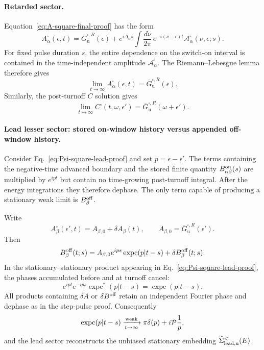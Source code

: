 \documentclass[
 reprint,
 superscriptaddress,
 amsmath,amssymb,
 aps,prb,
 longbibliography,
 floatfix
]{revtex4-2}
\newcommand{\expc}{\operatorname{expc}}
\begin{document}
\paragraph{Retarded sector.}
Equation~\eqref{eq:A-square-final-proof} has the form
\begin{equation*}
A_\alpha^\square(\epsilon,t)
=
\overline G_{\mathrm u}^{\square,R}(\epsilon)
+
e^{i\Delta_\alpha s}
\int\frac{d\nu}{2\pi}\,
e^{-i(\nu-\epsilon)t}
\mathcal A_\alpha^\square(\nu,\epsilon;s).
\end{equation*}
For fixed pulse duration \(s\), the entire dependence on the switch-on interval is contained in the time-independent amplitude \(\mathcal A_\alpha^\square\). The Riemann--Lebesgue lemma therefore gives
\begin{equation}
\lim_{t\to\infty}A_\alpha^\square(\epsilon,t)
=
\overline G_{\mathrm u}^{\square,R}(\epsilon).
\label{eq:square-asymp-A}
\end{equation}
Similarly, the post-turnoff \(C\) solution gives
\begin{equation}
\lim_{t\to\infty}C^\square(t,\omega,\epsilon')
=
\overline G_{\mathrm u}^{\square,R}(\omega+\epsilon').
\label{eq:square-asymp-C}
\end{equation}

\paragraph{Lead lesser sector: stored on-window history versus appended off-window history.}
Consider Eq.~\eqref{eq:Psi-square-lead-proof} and set
\(p=\epsilon-\epsilon'\). The terms containing the negative-time advanced boundary and the stored finite quantity \(B_{\alpha\beta}^{\rm on}(s)\) are multiplied by \(e^{ipt}\) but contain no time-growing post-turnoff integral. After the energy integrations they therefore dephase. The only term capable of producing a stationary weak limit is \(B_\beta^{\rm off}\).

Write
\begin{equation*}
A_\beta^\square(\epsilon',t)
=A_{\beta,0}+\delta A_\beta(t),
\qquad
A_{\beta,0}=\overline G_{\mathrm u}^{\square,R}(\epsilon').
\end{equation*}
Then
\begin{equation}
B_\beta^{\rm off}(t;s)
=
A_{\beta,0}
e^{ips}
\expc(p|t-s)
+
\delta B_\beta^{\rm off}(t;s).
\label{eq:square-asymp-Boff}
\end{equation}
In the stationary--stationary product appearing in Eq.~\eqref{eq:Psi-square-lead-proof}, the phases accumulated before and at turnoff cancel:
\begin{equation*}
e^{ipt}
e^{-ips}
\expc^*(p|t-s)
=
\expc(p|t-s).
\end{equation*}
All products containing \(\delta A\) or \(\delta B^{\rm off}\) retain an independent Fourier phase and dephase as in the step-pulse proof. Consequently
\begin{equation*}
\expc(p|t-s)
\xrightarrow[t\to\infty]{\rm weak}
\pi\delta(p)+i\mathcal P\frac1p,
\end{equation*}
and the lead sector reconstructs the unbiased stationary embedding \(\widetilde\Sigma_{\rm lead,u}^{<}(E)\).
\end{document}
